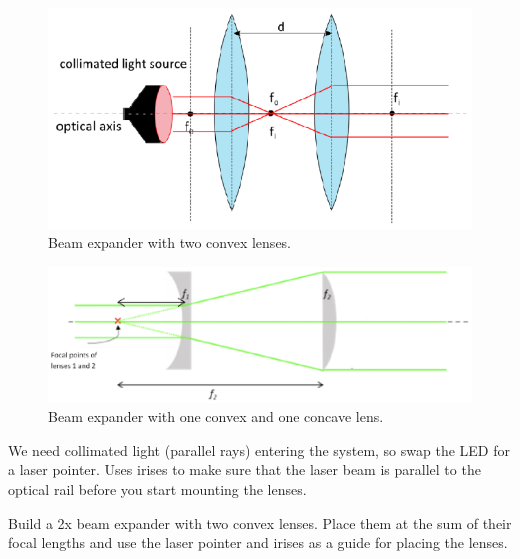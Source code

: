 \documentclass[a4paper]{report}
\begin{document}
\begin{figure}[h]
\center
\includegraphics[width=4.5in]{beamExpander1.eps}
\caption{Beam expander with two convex lenses.}
\label{beamExpander1}
\end{figure}

\begin{figure}[h]
\center
\includegraphics[width=4.5in]{beamExpander2.eps}
\caption{Beam expander with one convex and one concave lens.}
\label{beamExpander2}
\end{figure}

We need collimated light (parallel rays) entering the system, so swap the LED for a laser pointer. Uses irises to make sure that the laser beam is parallel to the optical rail before you start mounting the lenses.

Build a 2x beam expander with two convex lenses. Place them at the sum of their focal lengths and use the laser pointer and irises as a guide for placing the lenses. 
\end{document}
